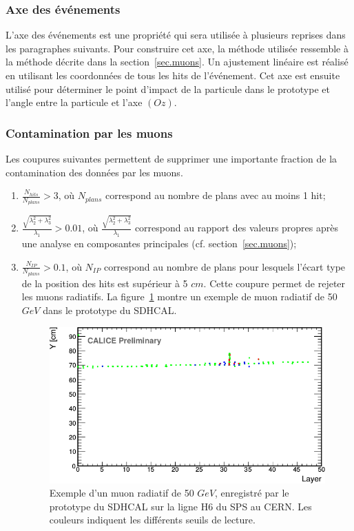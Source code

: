 \subsubsection{Axe des événements}
L'axe des événements est une propriété qui sera utilisée à plusieurs reprises dans les paragraphes suivants. Pour construire cet axe, la méthode utilisée ressemble à la méthode décrite dans la section~\ref{sec.muons}. Un ajustement linéaire est réalisé en utilisant les coordonnées de tous les hits de l'événement. Cet axe est ensuite utilisé pour déterminer le point d'impact de la particule dans le prototype et l'angle entre la particule et l'axe $(Oz)$.
\subsubsection{Contamination par les muons}
Les coupures suivantes permettent de supprimer une importante fraction de la contamination des données par les muons.
\begin{enumerate}[-]
\item $\frac{N_{hits}}{N_{plans}}>3$, où $N_{plans}$ correspond au nombre de plans avec au moins 1 hit;
\item $\frac{\sqrt{\lambda_2^2+\lambda_3^2}}{\lambda_1}>0.01$, où $\frac{\sqrt{\lambda_2^2+\lambda_3^2}}{\lambda_1}$ correspond au rapport des valeurs propres après une analyse en composantes principales (cf. section~\ref{sec.muons});
\item $\frac{N_{IP}}{N_{plans}}>0.1$, où $N_{IP}$ correspond au nombre de plans pour lesquels l'écart type de la position des hits est supérieur à 5 $cm$. Cette coupure permet de rejeter les muons radiatifs. La figure~\ref{fig:muon-rad} montre un exemple de muon radiatif de 50 $GeV$ dans le prototype du SDHCAL.
  \begin{figure}[!ht]
    \begin{center}
      \includegraphics[width=.6\textwidth]{SDHCAL/figs/muon-rad.png}
      \caption{Exemple d'un muon radiatif de 50 $GeV$, enregistré par le prototype du SDHCAL sur la ligne H6 du SPS au CERN. Les couleurs indiquent les différents seuils de lecture.}
      \label{fig:muon-rad}
    \end{center}
  \end{figure}
\end{enumerate}
